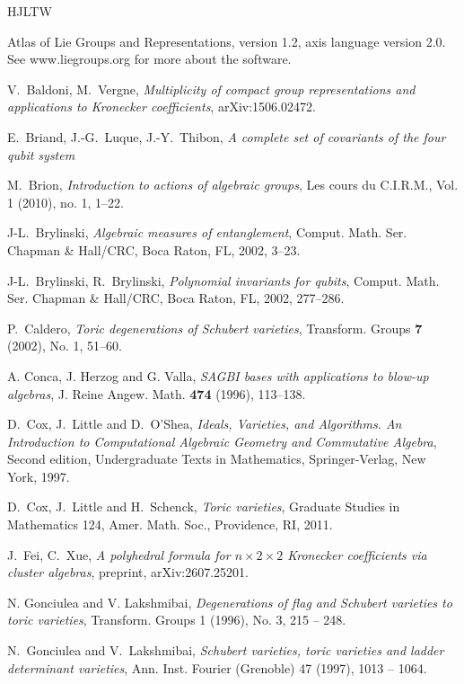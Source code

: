 \documentclass[reqno,11pt]{amsart}
\theoremstyle{remark}
\theoremstyle{definition}
\numberwithin{equation}{section}
\begin{document}
\begin{thebibliography}{HJLTW}

 Atlas of Lie Groups and Representations, version 1.2, axis language version 2.0. See www.liegroups.org for more about the software.

V.~Baldoni, M.~Vergne, {\it Multiplicity of compact group representations
and applications to Kronecker coefficients}, arXiv:1506.02472.

 E.~Briand, J.-G.~Luque, J.-Y.~Thibon, {\it A complete set of covariants of the four qubit system}

 M.~Brion, {\it Introduction to actions of algebraic groups}, Les cours du C.I.R.M., 
Vol. 1 (2010), no. 1, 1--22.

 J-L.~Brylinski, {\it Algebraic measures of entanglement}, Comput. Math. Ser. Chapman \& Hall/CRC, Boca Raton, FL, 2002, 3--23.

 J-L.~Brylinski, R.~Brylinski, {\it Polynomial invariants for qubits}, Comput. Math. Ser. Chapman \& Hall/CRC, Boca Raton, FL, 2002, 277--286.

 P.~Caldero, {\it Toric degenerations of	Schubert varieties}, Transform. Groups \textbf{7} (2002), No. 1, 51--60.

 A. Conca, J. Herzog and G. Valla,
\textit{SAGBI bases with applications to blow-up algebras}, J. Reine Angew. Math. \textbf{474} (1996), 113--138. 

 D.~Cox, J.~Little and D.~O'Shea,
\textit{Ideals, Varieties, and Algorithms. An Introduction to Computational Algebraic Geometry and Commutative Algebra}, Second edition, Undergraduate Texts in Mathematics, Springer-Verlag, New York, 1997.

 D.~Cox, J.~Little and H.~Schenck, {\it Toric varieties}, Graduate Studies in Mathematics 124,  Amer. Math. Soc., Providence, RI, 2011.

   J.~Fei, C.~Xue, {\it A polyhedral formula for $n\times 2\times 2$ Kronecker coefficients via cluster algebras}, preprint, arXiv:2607.25201.

 N. Gonciulea and V. Lakshmibai,
{\it Degenerations of flag and Schubert varieties to toric varieties}, Transform. Groups 1 (1996), No. 3, 215 -- 248.

 N.~Gonciulea and V.~Lakshmibai,
\textit{Schubert varieties, toric varieties and ladder determinant	varieties}, Ann. Inst. Fourier (Grenoble) 47 (1997), 1013 -- 1064.


\end{thebibliography}
\end{document}
